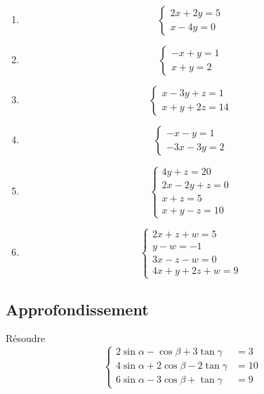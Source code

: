 \begin{multicols}{3}
\begin{enumerate}[label={}]
\item 
$$\begin{cases}
  2x + 2y = 5 \\
    x - 4y = 0
  \end{cases}$$

\item 
  $$\begin{cases}
    -x + y = 1 \\
    x + y = 2
  \end{cases}$$

\item 
$$\begin{cases}
    x - 3y + z = 1 \\
    x + y + 2z = 14
  \end{cases}$$


\item 
$$\begin{cases}
    -x - y = 1 \\
    -3x - 3y = 2
  \end{cases}$$


\item 
$$\begin{cases}
    4y + z = 20 \\
    2x - 2y + z = 0 \\
    x + z = 5 \\
    x + y - z = 10
  \end{cases}$$


\item 
$$\begin{cases}
    2x + z + w = 5 \\
    y - w = -1 \\
    3x - z - w = 0 \\
    4x + y + 2z + w = 9
  \end{cases}$$

\end{enumerate}
\end{multicols}

\vspace{2em}

\subsection{Approfondissement}
Résoudre 
$$\begin{cases}
  2 \sin \alpha-\cos \beta+3 \tan \gamma &= 3 \\
  4 \sin \alpha+2 \cos \beta-2 \tan \gamma &= 10 \\
  6 \sin \alpha-3 \cos \beta+\tan \gamma &= 9
\end{cases}$$

